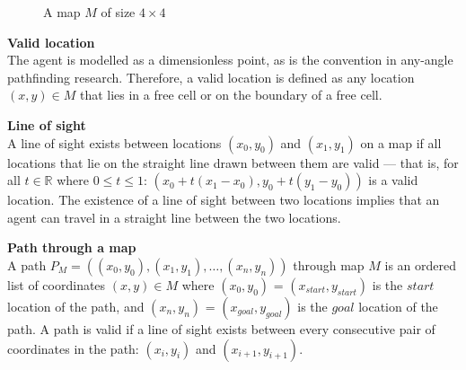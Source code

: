 \documentclass[12pt,notitlepage]{report}
\begin{document}
\begin{figure}
\centering
  \caption{A map $M$ of size $4 \times 4$}
\end{figure}

\begin{description}
\item{\bfseries Valid location}\\
The agent is modelled as a dimensionless point, as is the convention in any-angle pathfinding research\cite{Daniel10}. Therefore, a valid location is defined as any location $(x,y) \in M$ that lies in a free cell or on the boundary of a free cell.\\

\item{\bfseries Line of sight}\\
A line of sight exists between locations $(x_{0},y_{0})$ and $(x_{1},y_{1})$ on a map if all locations that lie on the straight line drawn between them are valid --- that is, for all $t \in \mathbb{R}$ where $0 \leq t \leq 1$: $(x_{0} + t(x_{1}-x_{0}),y_{0} + t(y_{1}-y_{0}))$ is a valid location. The existence of a line of sight between two locations implies that an agent can travel in a straight line between the two locations.\\

\item{\bfseries Path through a map}\\
A path  $P_{M} = ((x_{0},y_{0}), (x_{1},y_{1}), \ldots, (x_{n},y_{n}))$ through map $M$ is an ordered list of coordinates $(x,y) \in M$ where $(x_{0},y_{0})$ = $(x_{start},y_{start})$ is the $start$ location of the path, and $(x_{n},y_{n})$ = $(x_{goal},y_{goal})$ is the $goal$ location of the path. A path is valid if a line of sight exists between every consecutive pair of coordinates in the path: $(x_{i},y_{i})$ and $(x_{i+1},y_{i+1})$.\\
\end{description}
\end{document}
